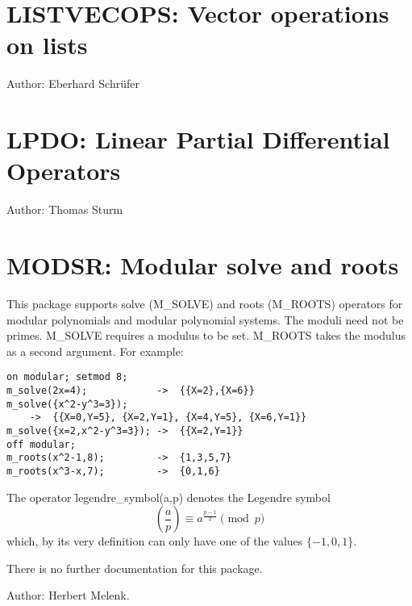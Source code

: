 

\newpage

\section{LISTVECOPS: Vector operations on lists}
\label{LISTVECOPS}

Author: Eberhard Schr\"{u}fer



\newpage

\section{LPDO: Linear Partial Differential Operators}
\label{LPDO}

Author: Thomas Sturm



\newpage

\section{MODSR: Modular solve and roots} 

This package supports solve (M\_SOLVE) and roots (M\_ROOTS) operators for
modular polynomials and modular polynomial systems.  The moduli need not
be primes. M\_SOLVE requires a modulus to be set.  M\_ROOTS takes the
modulus as a second argument. For example:

\begin{verbatim}
on modular; setmod 8;
m_solve(2x=4);            ->  {{X=2},{X=6}}
m_solve({x^2-y^3=3});
    ->  {{X=0,Y=5}, {X=2,Y=1}, {X=4,Y=5}, {X=6,Y=1}}
m_solve({x=2,x^2-y^3=3}); ->  {{X=2,Y=1}}
off modular;
m_roots(x^2-1,8);         ->  {1,3,5,7}
m_roots(x^3-x,7);         ->  {0,1,6}
\end{verbatim}

The operator \f{legendre\_symbol}(a,p) denotes the Legendre symbol
\begin{displaymath}
  \left(\frac{a}{p}\right) \equiv a^{\frac{p-1}{2}} \pmod{p}
\end{displaymath}
which, by its very definition can only have one of the values $\{-1,0,1\}$.

There is no further documentation for this package.

Author: Herbert Melenk.

